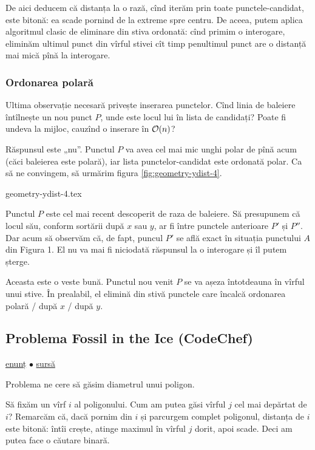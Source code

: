 \documentclass[../main.tex]{subfiles}
\begin{document}
De aici deducem că distanța la o rază, cînd iterăm prin toate punctele-candidat, este bitonă: ea scade pornind de la extreme spre centru. De aceea, putem aplica algoritmul clasic de eliminare din stiva ordonată: cînd primim o interogare, eliminăm ultimul punct din vîrful stivei cît timp penultimul punct are o distanță mai mică pînă la interogare.

\subsubsection*{Ordonarea polară}

Ultima observație necesară privește inserarea punctelor. Cînd linia de baleiere întîlnește un nou punct $P$, unde este locul lui în lista de candidați? Poate fi undeva la mijloc, cauzînd o inserare în $\mathcal{O}(n)$?

Răspunsul este „nu”. Punctul $P$ va avea cel mai mic unghi polar de pînă acum (căci baleierea este polară), iar lista punctelor-candidat este ordonată polar. Ca să ne convingem, să urmărim figura \ref{fig:geometry-ydist-4}.

{geometry-ydist-4.tex}

Punctul $P$ este cel mai recent descoperit de raza de baleiere. Să presupunem că locul său, conform sortării după $x$ sau $y$, ar fi între punctele anterioare $P'$ și $P''$. Dar acum să observăm că, de fapt, puncul $P'$ se află exact în situația punctului $A$ din Figura 1. El nu va mai fi niciodată răspunsul la o interogare și îl putem șterge.

Aceasta este o veste bună. Punctul nou venit $P$ se va așeza întotdeauna în vîrful unui stive. În prealabil, el elimină din stivă punctele care încalcă ordonarea polară / după $x$ / după $y$.

\subsection{Problema Fossil in the Ice (CodeChef)}
\label{problem:fossil-in-the-ice}

\href{https://www.codechef.com/problems/TFOSS}{enunț}
$\bullet$
\hyperref[code:fossil-in-the-ice]{sursă}

Problema ne cere să găsim diametrul unui poligon.

Să fixăm un vîrf $i$ al poligonului. Cum am putea găsi vîrful $j$ cel mai depărtat de $i$? Remarcăm că, dacă pornim din $i$ și parcurgem complet poligonul, distanța de $i$ este bitonă: întîi crește, atinge maximul în vîrful $j$ dorit, apoi scade. Deci am putea face o căutare binară.
\end{document}
